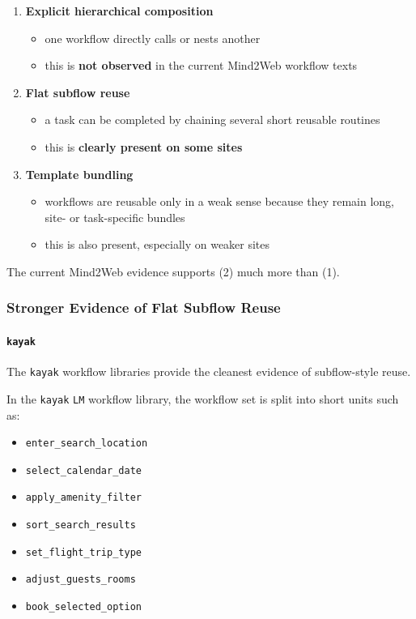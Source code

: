\begin{enumerate}
\def\labelenumi{\arabic{enumi}.}
\item
  \textbf{Explicit hierarchical composition}

  \begin{itemize}
  \tightlist
  \item
    one workflow directly calls or nests another
  \item
    this is \textbf{not observed} in the current Mind2Web workflow texts
  \end{itemize}
\item
  \textbf{Flat subflow reuse}

  \begin{itemize}
  \tightlist
  \item
    a task can be completed by chaining several short reusable routines
  \item
    this is \textbf{clearly present on some sites}
  \end{itemize}
\item
  \textbf{Template bundling}

  \begin{itemize}
  \tightlist
  \item
    workflows are reusable only in a weak sense because they remain
    long, site- or task-specific bundles
  \item
    this is also present, especially on weaker sites
  \end{itemize}
\end{enumerate}

The current Mind2Web evidence supports (2) much more than (1).

\subsubsection{Stronger Evidence of Flat Subflow
Reuse}

\paragraph{\texorpdfstring{\texttt{kayak}}{kayak}}

The \texttt{kayak} workflow libraries provide the cleanest evidence of
subflow-style reuse.

In the \texttt{kayak} \texttt{LM} workflow library,
the workflow set is split into short units such as:

\begin{itemize}
\tightlist
\item
  \texttt{enter\_search\_location}
\item
  \texttt{select\_calendar\_date}
\item
  \texttt{apply\_amenity\_filter}
\item
  \texttt{sort\_search\_results}
\item
  \texttt{set\_flight\_trip\_type}
\item
  \texttt{adjust\_guests\_rooms}
\item
  \texttt{book\_selected\_option}
\end{itemize}

